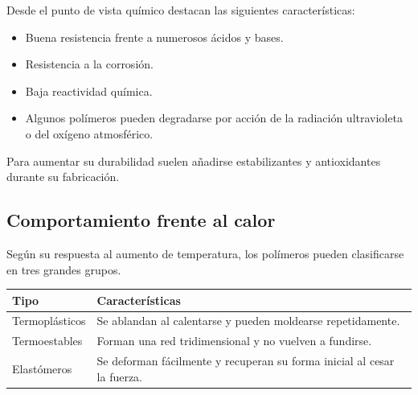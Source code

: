 Desde el punto de vista químico destacan las siguientes características:

\begin{itemize}

\item Buena resistencia frente a numerosos ácidos y bases.

\item Resistencia a la corrosión.

\item Baja reactividad química.

\item Algunos polímeros pueden degradarse por acción de la radiación
ultravioleta o del oxígeno atmosférico.

\end{itemize}

Para aumentar su durabilidad suelen añadirse estabilizantes y antioxidantes
durante su fabricación.


\subsection{Comportamiento frente al calor}

Según su respuesta al aumento de temperatura, los polímeros pueden clasificarse
en tres grandes grupos.

\begin{center}

\renewcommand{\arraystretch}{1.4}

\begin{tabular}{p{3.2cm}p{8.8cm}}

\toprule

\textbf{Tipo} &
\textbf{Características}

\\

\midrule

Termoplásticos

& Se ablandan al calentarse y pueden moldearse repetidamente.

\\

Termoestables

& Forman una red tridimensional y no vuelven a fundirse.

\\

Elastómeros

& Se deforman fácilmente y recuperan su forma inicial al cesar la fuerza.

\\

\bottomrule

\end{tabular}

\end{center}

